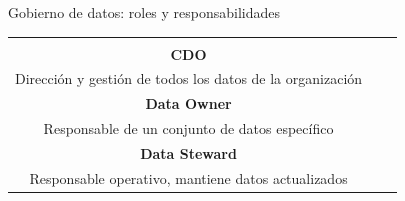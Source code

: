 \documentclass{beamer}
\begin{document}
\begin{frame}{Gobierno de datos: roles y responsabilidades}
    \begin{center}
        \begin{tabular}{ccc}
            \begin{minipage}{2.8cm}
                \centering
                \fbox{\begin{minipage}[t][3.5cm]{2.6cm}
                    \centering
                    \vspace{0.2cm}
                    {\Large \faUserSecret}\\[0.3cm]
                    \textbf{CDO}\\[0.2cm]
                    {\scriptsize Dirección y gestión de todos los datos de la organización}
                \end{minipage}}
            \end{minipage} &
            \begin{minipage}{2.8cm}
                \centering
                \fbox{\begin{minipage}[t][3.5cm]{2.6cm}
                    \centering
                    \vspace{0.2cm}
                    {\Large \faUser}\\[0.3cm]
                    \textbf{Data Owner}\\[0.2cm]
                    {\scriptsize Responsable de un conjunto de datos específico}
                \end{minipage}}
            \end{minipage} &
            \begin{minipage}{2.8cm}
                \centering
                \fbox{\begin{minipage}[t][3.5cm]{2.6cm}
                    \centering
                    \vspace{0.2cm}
                    {\Large \faWrench}\\[0.3cm]
                    \textbf{Data Steward}\\[0.2cm]
                    {\scriptsize Responsable operativo, mantiene datos actualizados}
                \end{minipage}}
            \end{minipage}
        \end{tabular}
    \end{center}
\end{frame}
\end{document}
